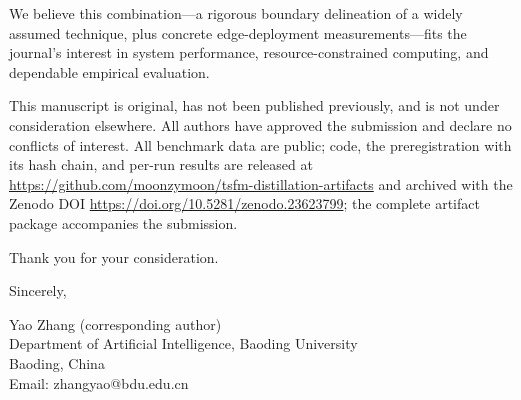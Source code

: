 \documentclass[10pt]{article}
\begin{document}
We believe this combination---a rigorous boundary delineation of a widely
assumed technique, plus concrete edge-deployment measurements---fits the
journal's interest in system performance, resource-constrained computing, and
dependable empirical evaluation.

This manuscript is original, has not been published previously, and is not
under consideration elsewhere. All authors have approved the submission and
declare no conflicts of interest. All benchmark data are public; code, the
preregistration with its hash chain, and per-run results are released at
\url{https://github.com/moonzymoon/tsfm-distillation-artifacts} and archived
with the Zenodo DOI \url{https://doi.org/10.5281/zenodo.23623799}; the
complete artifact package accompanies the submission.

Thank you for your consideration.

\medskip
Sincerely,

Yao Zhang (corresponding author)\\
Department of Artificial Intelligence, Baoding University\\
Baoding, China\\
Email: zhangyao@bdu.edu.cn
\end{document}
